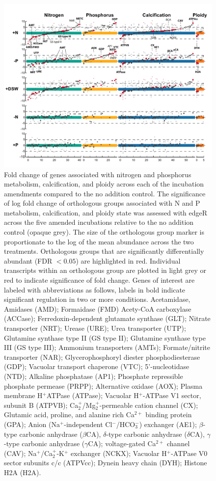 \begin{figure}[p!]
  \centering
    \includegraphics[width=1\textwidth]{Images/C5_Figure4_v1.pdf}
    \caption[Fold change of genes associated with nitrogen and phosphorus metabolism, calcification, and ploidy across each of the incubation amendments compared to the no addition control]{Fold change of genes associated with nitrogen and phosphorus metabolism, calcification, and ploidy across each of the incubation amendments compared to the no addition control. The significance of log fold change of orthologous groups associated with N and P metabolism, calcification, and ploidy state was assessed with edgeR across the five amended incubations relative to the no addition control (opaque grey). The size of the orthologous group marker is proportionate to the log of the mean abundance across the two treatments. Orthologous groups that are significantly differentially abundant (FDR $< 0.05$) are highlighted in red. Individual transcripts within an orthologous group are plotted in light grey or red to indicate significance of fold change. Genes of interest are labeled with abbreviations as follows, labels in bold indicate significant regulation in two or more conditions. Acetamidase, Amidases (AMD); Formaidase (FMD) Acety-CoA carboxylase (ACCase); Ferredoxin-dependent glutamate synthase (GLT); Nitrate transporter (NRT); Urease (URE); Urea transporter (UTP); Glutamine synthase type II (GS type II); Glutamine synthase type III (GS type III); Ammonium transporters (AMTs); Formate/nitrite transporter (NAR); Glycerophosphoryl diester phosphodiesterase (GDP); Vacuolar transport chaperone (VTC); 5'-nucleotidase (NTD); Alkaline phosphatase (AP1); Phosphate repressible phosphate permease (PRPP); Alternative oxidase (AOX); Plasma membrane H$^+$ATPase (ATPase); Vacuolar H$^+$-ATPase V1 sector, subunit B (ATPVB); Ca$_{2}^+$/Mg$_{2}^+$-permeable cation channel (CX); Glutamic acid, proline, and alanine rich Ca$^{2+}$ binding protein (GPA); Anion (Na$^+$-independent Cl$^-$/HCO$_{3}^-$) exchanger (AE1); $\beta$-type carbonic anhydrase ($\beta$CA), $\delta$-type carbonic anhydrase ($\delta$CA), $\gamma$-type carbonic anhydrase ($\gamma$CA); voltage-gated Ca$^{2+}$ channel (CAV); Na$^+$/Ca$_{2}^+$-K$^+$ exchanger (NCKX); Vacuolar H$^+$-ATPase V0 sector subunits c/c (ATPVcc); Dynein heavy chain (DYH); Histone H2A (H2A).}

\end{figure}
